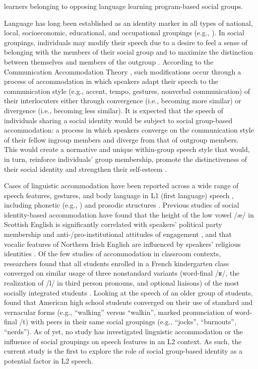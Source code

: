 \documentclass[output=paper,colorlinks,citecolor=brown,draftmode]{langscibook}
\begin{document}
learners belonging to opposing language learning program-based social groups.


Language has long been established as an identity marker in all types of national, local, socioeconomic, educational, and occupational groupings (e.g., \citealt{Dunbar:2003, Labov1972patterns, Labov2001, MangeGeorget2009, Roberts2013, Sankoff.Fonollosa1997}). In social groupings, individuals may modify their speech due to a desire to feel a sense of belonging with the members of their social group and to maximize the distinction between themselves and members of the outgroup \citep{Ehala2018}. According to the Communication Accommodation Theory \citep{Giles1973, Giles:1991}, such modifications occur through a process of accommodation in which speakers adapt their speech to the communication style (e.g., accent, tempo, gestures, nonverbal communication) of their interlocuters either through convergence (i.e., becoming more similar) or divergence (i.e., becoming less similar). It is expected that the speech of individuals sharing a social identity would be subject to social group-based accommodation: a process in which speakers converge on the communication style of their fellow ingroup members and diverge from that of outgroup members. This would create a normative and unique within-group speech style that would, in turn, reinforce individuals’ group membership, promote the distinctiveness of their social identity \citep{Ehala2018} and strengthen their self-esteem \citep{HoggHinkle2004}.


Cases of linguistic accommodation have been reported across a wide range of speech features, gestures, and body language in L1 (first language) speech \citep{Ehala2018}, including phonetic (e.g., \citealt{Babel2012, Nielsen2011, ZellouNielsen2016}) and prosodic structures \citep{Giles:1991, LevitanHirschberg:2011}. Previous studies of social identity-based accommodation have found that the height of the low vowel /æ/ in Scottish English is significantly correlated with  speakers’ political party membership \citep{Hall-LewFriskney2017} and anti-/pro-institutional attitudes of engagement \citep{Lawson2011}, and that vocalic features of Northern Irish English are influenced by speakers’ religious identities \citep{McCafferty:1999}. Of the few studies of accommodation in classroom contexts, researchers found that all students enrolled in a French kindergarten class converged on similar usage of three nonstandard variants (word-final /ʁ/, the realization of /l/ in third person pronouns, and optional liaisons) of the most socially integrated students \citep{NardyBarbu2014}. Looking at the speech of an older group of students, \citet{Eckert1989, Eckert2008} found that American high school students converged on their use of standard and vernacular forms (e.g., “walking” versus “walkin”, marked pronunciation of word-final /t) with peers in their same social groupings (e.g., “jocks”, “burnouts”, “nerds”). As of yet, no study has investigated linguistic accommodation or the influence of social groupings on speech features in an L2 context. As such, the current study is the first to explore the role of social group-based identity as a potential factor in L2 speech.
\end{document}
